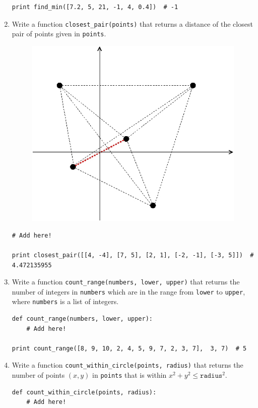 \documentclass[../main.tex]{subfiles}
\begin{document}
\begin{enumerate}
\begin{verbatim}
print find_min([7.2, 5, 21, -1, 4, 0.4])  # -1
\end{verbatim}

\item Write a function \texttt{closest\_pair(points)} that returns a distance of the closest pair of points given in \texttt{points}.
\begin{figure}[H]
\centering
\includegraphics[width=0.5\linewidth]{"./lectures/lecture4_q8"}
\label{fig:lecture4q8}
\end{figure}
\begin{verbatim}
# Add here!
	
print closest_pair([[4, -4], [7, 5], [2, 1], [-2, -1], [-3, 5]])  # 4.472135955
\end{verbatim}

\item Write a function \texttt{count\_range(numbers, lower, upper)} that returns the number of integers in \texttt{numbers} which are in the range from \texttt{lower} to \texttt{upper}, where \texttt{numbers} is a list of integers.
\begin{verbatim}
def count_range(numbers, lower, upper):
	# Add here!
	
print count_range([8, 9, 10, 2, 4, 5, 9, 7, 2, 3, 7],  3, 7)  # 5
\end{verbatim}

\item Write a function \texttt{count\_within\_circle(points, radius)} that returns the number of points $(x, y)$ in \texttt{points} that is within $x^2 + y^2 \leq \texttt{radius}^2$.
\begin{verbatim}
def count_within_circle(points, radius):
	# Add here!
	

\end{verbatim}
\end{enumerate}
\end{document}
